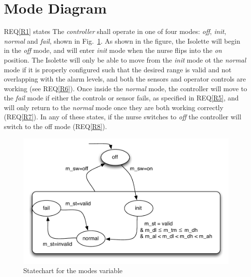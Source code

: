 \section{Mode Diagram}

REQ\ref{R1} states The \emph{controller} shall operate in one of four modes: \emph{off}, \emph{init}, \emph{normal} and \emph{fail}, shown in Fig.~\ref{fig:sc}. As shown in the figure, the Isolette will begin in the \emph{off} mode, and will enter \emph{init} mode when the nurse flips  into the \emph{on} position. The Isolette will only be able to move from the \emph{init} mode ot the \emph{normal} mode if it is properly configured such that the desired range is valid and not overlapping with the alarm levels, and both the sensors and operator controls are working (see REQ\ref{R6}).
Once inside the \emph{normal} mode, the controller will move to the \emph{fail} mode if either the controls or sensor fails, as specified in REQ\ref{R5}, and will only return to the \emph{normal} mode once they are both working correctly (REQ\ref{R7}). In any of these states, if the nurse switches  to \emph{off} the controller will switch to the off mode (REQ\ref{R8}).

\begin{figure}[!htb]
\begin{mdframed}
\begin{center}
\includegraphics[width=.9\textwidth]{pics/mode-statechart.pdf}
\end{center}
\end{mdframed}
\caption{Statechart for the modes variable }
\label{fig:sc}
\end{figure}